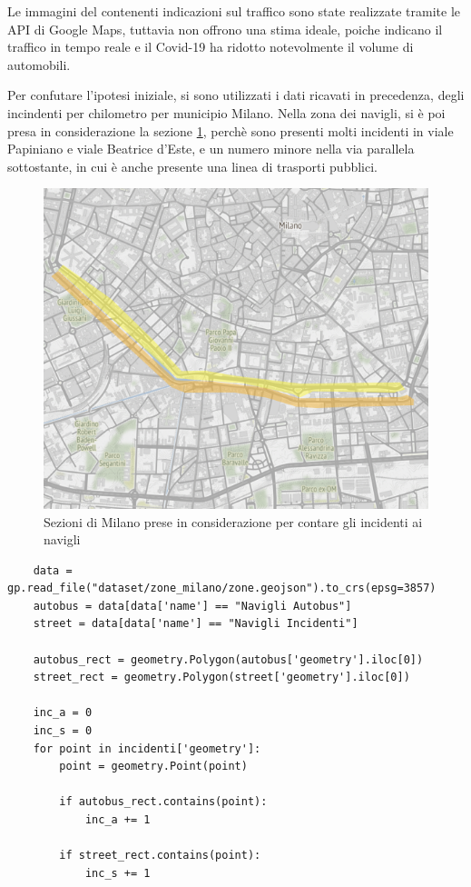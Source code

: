 \documentclass[a4paper]{report}
\begin{document}
Le immagini del contenenti indicazioni sul traffico sono state realizzate tramite le API di 
Google Maps, tuttavia non offrono una stima ideale, poiche indicano il traffico in tempo reale e 
il Covid-19 ha ridotto notevolmente il volume di automobili.

Per confutare l'ipotesi iniziale, si sono utilizzati i dati ricavati in precedenza, 
degli incindenti per chilometro per municipio Milano. 
Nella zona dei navigli, si è poi presa in considerazione la sezione \ref{fig:zona-navigli-rect}, 
perchè sono presenti molti incidenti in viale Papiniano e viale Beatrice d'Este, 
e un numero minore nella via parallela sottostante, in cui è anche presente 
una linea di trasporti pubblici.

\begin{figure}
    \includegraphics[width=\linewidth]{../src/atm/zona_navigli_rect.png}
    \caption{Sezioni di Milano prese in considerazione per contare gli incidenti ai navigli}
    \label{fig:zona-navigli-rect}
\end{figure}

\begin{lstlisting}
    data = gp.read_file("dataset/zone_milano/zone.geojson").to_crs(epsg=3857)
    autobus = data[data['name'] == "Navigli Autobus"]
    street = data[data['name'] == "Navigli Incidenti"]

    autobus_rect = geometry.Polygon(autobus['geometry'].iloc[0])
    street_rect = geometry.Polygon(street['geometry'].iloc[0])

    inc_a = 0
    inc_s = 0
    for point in incidenti['geometry']: 
        point = geometry.Point(point)

        if autobus_rect.contains(point): 
            inc_a += 1
        
        if street_rect.contains(point): 
            inc_s += 1
\end{lstlisting}
\end{document}
